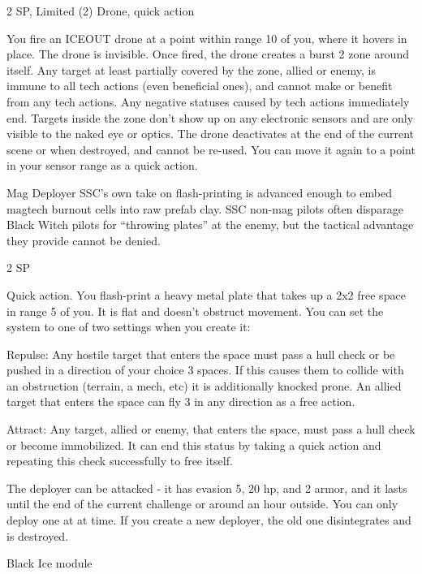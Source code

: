 2 SP, Limited (2)  
Drone, quick action  

You fire an ICEOUT drone at a point within range 10 of you, where it hovers in place. The drone is  
invisible. Once fired, the drone creates a burst 2 zone around itself. Any target at least partially  
covered by the zone, allied or enemy, is immune to all tech actions (even beneficial ones), and  
cannot make or benefit from any tech actions. Any negative statuses caused by tech actions  
immediately end. Targets inside the zone don’t show up on any electronic sensors and are only  
visible to the naked eye or optics. The drone deactivates at the end of the current scene or when  
destroyed, and cannot be re-used. You can move it again to a point in your sensor range as a  
quick action.
 

Mag Deployer  
SSC’s own take on flash-printing is advanced enough to embed magtech burnout cells into raw  
prefab clay. SSC non-mag pilots often disparage Black Witch pilots for “throwing plates” at the  
enemy, but the tactical advantage they provide cannot be denied.   

2 SP  

Quick action.  
You flash-print a heavy metal plate that takes up a 2x2 free space in range 5 of you. It is flat and  
doesn’t obstruct movement. You can set the system to one of two settings when you create it:
 
         Repulse: Any hostile target that enters the space must pass a hull check or be pushed in  
         a direction of your choice 3 spaces. If this causes them to collide with an obstruction  
         (terrain, a mech, etc) it is additionally knocked prone. An allied target that enters the  
         space can fly 3 in any direction as a free action.
 
         Attract: Any target, allied or enemy, that enters the space, must pass a hull check or  
         become immobilized. It can end this status by taking a quick action and repeating this  
         check successfully to free itself.
 
The deployer can be attacked - it has evasion 5, 20 hp, and 2 armor, and it lasts until the end of  
the current challenge or around an hour outside. You can only deploy one at at time. If you create  
a new deployer, the old one disintegrates and is destroyed.
 

Black Ice module
 

                                                                                                                    


